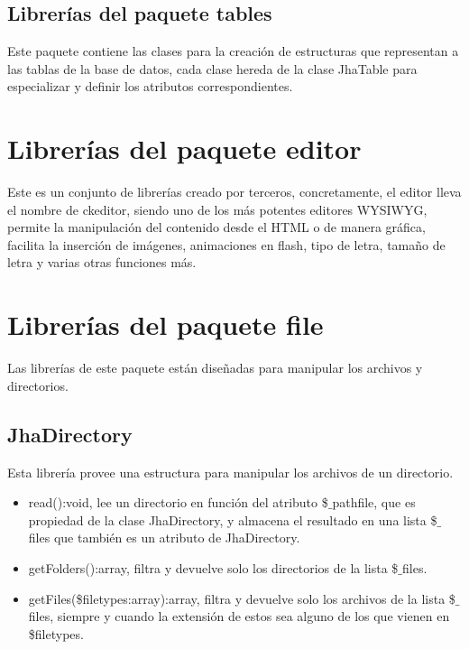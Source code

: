 \subsection{Librer\'ias del paquete \textsf{tables}}
Este paquete contiene las clases para la creaci\'on de estructuras que representan a las tablas de la base de datos, cada clase hereda de la clase JhaTable para especializar y definir los atributos correspondientes.

\section{Librer\'ias del paquete \textsf{editor}}
Este es un conjunto de librer\'ias creado por terceros, concretamente, el editor lleva el nombre de ckeditor, siendo uno de los m\'as potentes editores WYSIWYG, permite la manipulaci\'on del contenido desde el HTML o de manera gr\'afica, facilita la inserci\'on de im\'agenes, animaciones en flash, tipo de letra, tama\~no de letra y varias otras funciones m\'as.

\section{Librer\'ias del paquete \textsf{file}}
Las librer\'ias de este paquete est\'an dise\~nadas para manipular los archivos y directorios.

\subsection{JhaDirectory}
Esta librer\'ia provee una estructura para manipular los archivos de un directorio.
\begin{itemize}
\item \textsf{read():void}, lee un directorio en funci\'on del atributo \textsf{\$$\_$pathfile}, que es propiedad de la clase JhaDirectory, y almacena el resultado en una lista \textsf{\$$\_$files} que tambi\'en es un atributo de JhaDirectory.
\item \textsf{getFolders():array}, filtra y devuelve solo los directorios de la lista \textsf{\$$\_$files}.
\item \textsf{getFiles(\$filetypes:array):array}, filtra y devuelve solo los archivos de la lista \textsf{\$$\_$files}, siempre y cuando la extensi\'on de estos sea alguno de los que vienen en \textsf{\$filetypes}.
\end{itemize}


